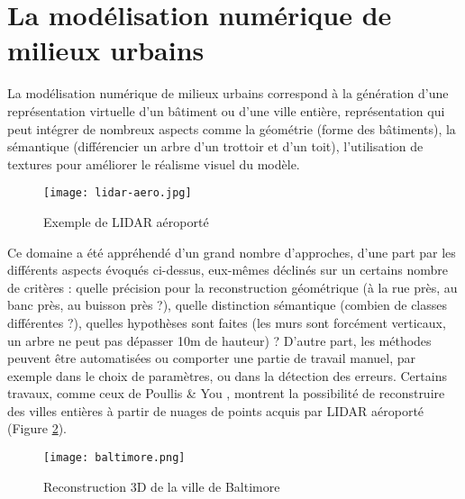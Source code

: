 \newpage
\thispagestyle{fancy}

\section{La modélisation numérique de milieux urbains}

La modélisation numérique de milieux urbains correspond à la génération d'une représentation virtuelle d'un bâtiment ou d'une ville entière, représentation qui peut intégrer de nombreux aspects comme la géométrie (forme des bâtiments), la sémantique (différencier un arbre d'un trottoir et d'un toit), l'utilisation de textures pour améliorer le réalisme visuel du modèle.
\begin{figure}[H]
  \centering
   \texttt{[image: lidar-aero.jpg]}
   \caption{Exemple de LIDAR aéroporté}
   \label{lidar}
\end{figure}
Ce domaine a été appréhendé d'un grand nombre d'approches, d'une part par les différents aspects évoqués ci-dessus, eux-mêmes déclinés sur un certains nombre de critères : quelle précision pour la reconstruction géométrique (à la rue près, au banc près, au buisson près  ?), quelle distinction sémantique (combien de classes différentes ?), quelles hypothèses sont faites (les murs sont forcément verticaux, un arbre ne peut pas dépasser 10m de hauteur) ?
D'autre part, les méthodes peuvent être automatisées ou comporter une partie de travail manuel, par exemple dans le choix de paramètres, ou dans la détection des erreurs. Certains travaux, comme ceux de Poullis \& You \cite{PY}, montrent la possibilité de reconstruire des villes entières à partir de nuages de points acquis par LIDAR aéroporté (Figure \ref{baltimore}).
\begin{figure}[H]
  \centering
   \texttt{[image: baltimore.png]}
   \caption{Reconstruction 3D de la ville de Baltimore}
   \label{baltimore}
\end{figure}